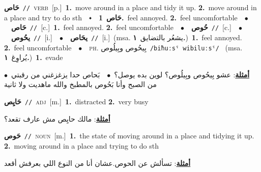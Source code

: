 \documentclass[10pt,a4paper,twoside]{article} %
\begin{document}
\begin{multicols}{2}
{\setlength\topsep{0pt}\textbf{\foreignlanguage{arabic}{حَاص}}\ {\color{gray}\texttt{//}\color{black}}\ \textsc{verb}\ [p.]\ \textbf{1.}~move around in a place and tidy it up.  \textbf{2.}~move around in a place and try to do sth\ \ $\smblkdiamond$\ \ \setlength\topsep{0pt}\textbf{\foreignlanguage{arabic}{حَاص}}\ \textbf{1.}~feel annoyed.  \textbf{2.}~feel uncomfortable\ \ $\bullet$\ \ \setlength\topsep{0pt}\textbf{\foreignlanguage{arabic}{حَاص}}\ {\color{gray}\texttt{//}\color{black}}\ [c.]\ \textbf{1.}~feel annoyed.  \textbf{2.}~feel uncomfortable\ \ $\bullet$\ \ \setlength\topsep{0pt}\textbf{\foreignlanguage{arabic}{حُوص}}\ {\color{gray}\texttt{//}\color{black}}\ [c.]\ \ $\bullet$\ \ \setlength\topsep{0pt}\textbf{\foreignlanguage{arabic}{يحُوص}}\ {\color{gray}\texttt{//}\color{black}}\ [i.]\ \ $\bullet$\ \ \setlength\topsep{0pt}\textbf{\foreignlanguage{arabic}{يحَاص}}\ {\color{gray}\texttt{//}\color{black}}\ [i.]\ \color{gray}(msa. \foreignlanguage{arabic}{يشعُر بالتضايق}~\foreignlanguage{arabic}{\textbf{١.}})\color{black}\ \textbf{1.}~feel annoyed.  \textbf{2.}~feel uncomfortable\ \ $\bullet$\ \ \textsc{ph.} \color{gray} \foreignlanguage{arabic}{بِيحُوص وبِيلُوص}\color{black}\ {\color{gray}\texttt{/{\sffamily biħuːsˤ wibiluːsˤ}/}\color{black}}\ \color{gray} (msa. \foreignlanguage{arabic}{يُراوِغ}~\foreignlanguage{arabic}{\textbf{١.}})\color{black}\ \textbf{1.}~evade\  \begin{flushright}\color{gray}\foreignlanguage{arabic}{\textbf{\underline{\foreignlanguage{arabic}{أمثلة}}}: عشو بِيحُوص وبِيلُوص؟ لوين بده يوصل؟\ $\bullet$\ \  بَحاص حدا يزغزغني من رقبتي\ $\bullet$\ \  من الصبح وأنا بَحُوص بالمطبخ والله ماهديت ولا ثانية}\end{flushright}\color{black}} \vspace{2mm}

{\setlength\topsep{0pt}\textbf{\foreignlanguage{arabic}{حَايِص}}\ {\color{gray}\texttt{//}\color{black}}\ \textsc{adj}\ [m.]\ \textbf{1.}~distracted  \textbf{2.}~very busy\  \begin{flushright}\color{gray}\foreignlanguage{arabic}{\textbf{\underline{\foreignlanguage{arabic}{أمثلة}}}: مالك حايِص مش عارف تقعد؟}\end{flushright}\color{black}} \vspace{2mm}

{\setlength\topsep{0pt}\textbf{\foreignlanguage{arabic}{حَوص}}\ {\color{gray}\texttt{//}\color{black}}\ \textsc{noun}\ [m.]\ \textbf{1.}~the state of moving around in a place and tidying it up.  \textbf{2.}~moving around in a place and trying to do sth\  \begin{flushright}\color{gray}\foreignlanguage{arabic}{\textbf{\underline{\foreignlanguage{arabic}{أمثلة}}}: تسألش عن الحوص.عشان أنا من النوع اللي بعرفش أقعد}\end{flushright}\color{black}} \vspace{2mm}


\end{multicols}
\end{document}
